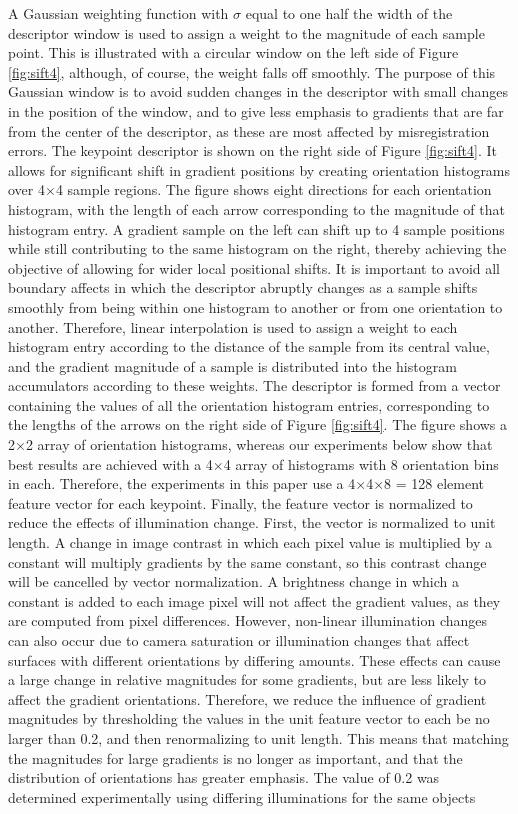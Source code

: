 A Gaussian weighting function with $\sigma$ equal to one half the width of the descriptor
window is used to assign a weight to the magnitude of each sample point. This is illustrated
with a circular window on the left side of Figure \ref{fig:sift4}, although, of course, the weight falls off smoothly. The purpose of this Gaussian window is to avoid sudden changes in the
descriptor with small changes in the position of the window, and to give less emphasis
to gradients that are far from the center of the descriptor, as these are most affected by
misregistration errors.
The keypoint descriptor is shown on the right side of Figure \ref{fig:sift4}. It allows for signiﬁcant
shift in gradient positions by creating orientation histograms over 4$\times$4 sample regions. The
ﬁgure shows eight directions for each orientation histogram, with the length of each arrow
corresponding to the magnitude of that histogram entry. A gradient sample on the left can
shift up to 4 sample positions while still contributing to the same histogram on the right,
thereby achieving the objective of allowing for wider local positional shifts.
It is important to avoid all boundary affects in which the descriptor abruptly changes as
a sample shifts smoothly from being within one histogram to another or from one orientation
to another. Therefore, linear interpolation is used to assign a weight to each histogram
entry according to the distance of the sample from its central value, and the gradient magnitude
of a sample is distributed into the histogram accumulators according to these weights.
The descriptor is formed from a vector containing the values of all the orientation histogram
entries, corresponding to the lengths of the arrows on the right side of Figure \ref{fig:sift4}. The
ﬁgure shows a 2$\times$2 array of orientation histograms, whereas our experiments below show
that best results are achieved with a 4$\times$4 array of histograms with 8 orientation bins in each.
Therefore, the experiments in this paper use a 4$\times$4$\times$8 = 128 element feature vector for each
keypoint.
Finally, the feature vector is normalized to reduce the effects of illumination change.
First, the vector is normalized to unit length. A change in image contrast in which each
pixel value is multiplied by a constant will multiply gradients by the same constant, so this
contrast change will be cancelled by vector normalization. A brightness change in which a
constant is added to each image pixel will not affect the gradient values, as they are computed
from pixel differences. However, non-linear illumination changes can also occur due
to camera saturation or illumination changes that affect surfaces with different orientations
by differing amounts. These effects can cause a large change in relative magnitudes for
some gradients, but are less likely to affect the gradient orientations. Therefore, we reduce
the inﬂuence of gradient magnitudes by thresholding the values in the unit feature vector to
each be no larger than 0.2, and then renormalizing to unit length. This means that matching
the magnitudes for large gradients is no longer as important, and that the distribution of
orientations has greater emphasis. The value of 0.2 was determined experimentally using
differing illuminations for the same objects

